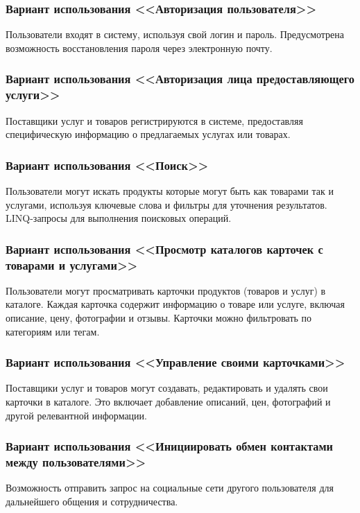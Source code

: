 \subsubsection{Вариант использования <<Авторизация пользователя>>} 
Пользователи входят в систему, используя свой логин и пароль. Предусмотрена возможность восстановления пароля через электронную почту.

\subsubsection{Вариант использования <<Авторизация лица предоставляющего услуги>>}
Поставщики услуг и товаров регистрируются в системе, предоставляя специфическую информацию о предлагаемых услугах или товарах.

\subsubsection{Вариант использования <<Поиск>>} 
Пользователи могут искать продукты которые могут быть как товарами так и услугами, используя ключевые слова и фильтры для уточнения результатов. LINQ-запросы для выполнения поисковых операций.

\subsubsection{Вариант использования <<Просмотр каталогов карточек с товарами и услугами>>}
Пользователи могут просматривать карточки продуктов (товаров и услуг) в каталоге. Каждая карточка содержит информацию о товаре или услуге, включая описание, цену, фотографии и отзывы. Карточки можно фильтровать по категориям или тегам.

\subsubsection{Вариант использования <<Управление своими карточками>>}
Поставщики услуг и товаров могут создавать, редактировать и удалять свои карточки в каталоге. Это включает добавление описаний, цен, фотографий и другой релевантной информации.

\subsubsection{Вариант использования <<Инициировать обмен контактами между пользователями>>} 
Возможность отправить запрос на социальные сети другого пользователя для дальнейшего общения и сотрудничества.


